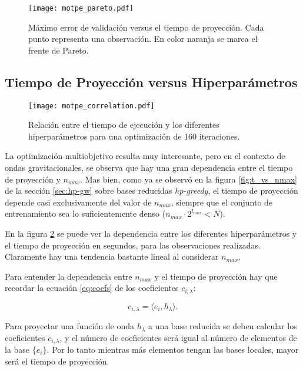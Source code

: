 \begin{figure}[h!]
\centering
\texttt{[image: motpe\_pareto.pdf]}
\caption{Máximo error de validación versus el tiempo de proyección. Cada punto representa una observación. En color naranja se marca el frente de Pareto.}
\label{fig:pareto}
\end{figure}

\subsection{Tiempo de Proyección versus Hiperparámetros}
\label{sec:corr_t}

\begin{figure}[p]
\centering
\texttt{[image: motpe\_correlation.pdf]}
\caption{Relación entre el tiempo de ejecución y los diferentes hiperparámetros para una optimización de 160 iteraciones.}
\label{fig:motpe_param_rel}
\end{figure}


La optimización multiobjetivo resulta muy interesante, pero en el contexto de ondas gravitacionales, se observa que hay una gran dependencia entre el tiempo de proyección y $n_{max}$. Mas bien, como ya se observó en la figura \ref{fig:t_vs_nmax} de la sección \ref{sec:hp-gw} sobre bases reducidas \textit{hp-greedy}, el tiempo de proyección depende casi exclusivamente del valor de $n_{max}$, siempre que el conjunto de entrenamiento sea lo suficientemente denso ($n_{max} \cdot 2^{l_{max}} < N$).

En la figura \ref{fig:motpe_param_rel} se puede ver la dependencia entre los diferentes hiperparámetros y el tiempo de proyección en segundos, para las observaciones realizadas. Claramente hay una tendencia bastante lineal al considerar $n_{max}$.

Para entender la dependencia entre $n_{max}$ y el tiempo de proyección hay que recordar la ecuación \eqref{eq:coefs} de los coeficientes $c_{i, \lambda}$:

\[
c_{i, \lambda} = \langle e_i, h_{\lambda} \rangle .
\]

Para proyectar una función de onda $h_{\lambda}$ a una base reducida se deben calcular los coeficientes $c_{i, \lambda}$, y el número de coeficientes será igual al número de elementos de la base $\{  e_i\}$. Por lo tanto mientras más elementos tengan las bases locales, mayor será el tiempo de proyección.
